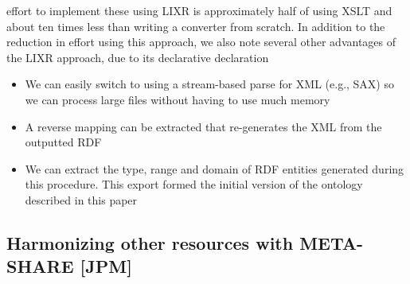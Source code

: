 \documentclass{llncs}
\begin{document}
{effort to implement these using LIXR is approximately half of using XSLT and
about ten times less than writing a converter from scratch.
In addition to the reduction in effort using this approach, we also note several
other advantages of the LIXR approach, due to its declarative declaration
\begin{itemize}
\item We can easily switch to using a stream-based parse for XML (e.g., SAX)
so we can process large files without having to use much memory
\item A reverse mapping can be extracted that re-generates the XML from the
outputted RDF
\item We can extract the type, range and domain of RDF entities generated
during this procedure. This export formed the initial version of the
ontology described in this paper
\end{itemize}

\subsection{Harmonizing other resources with META-SHARE [JPM]}
\label{sec:harmonization}

}
\end{document}
